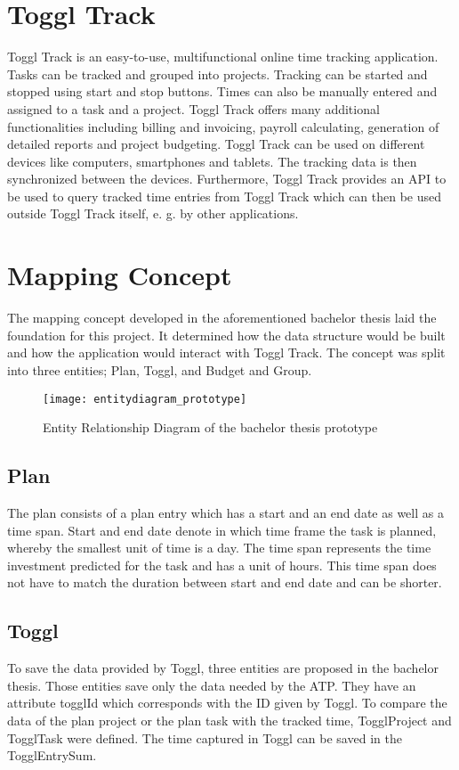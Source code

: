 \section{Toggl Track}
Toggl Track is an easy-to-use, multifunctional online time tracking application. Tasks can be tracked and grouped into projects. Tracking can be started and stopped using start and stop buttons. Times can also be manually entered and assigned to a task and a project. Toggl Track offers many additional functionalities including billing and invoicing, payroll calculating, generation of detailed reports and project budgeting. Toggl Track can be used on different devices like computers, smartphones and tablets. The tracking data is then synchronized between the devices. Furthermore, Toggl Track provides an API to be used to query tracked time entries from Toggl Track which can then be used outside Toggl Track itself, e. g. by other applications. \cite{bachelorarbeit_Egger_Verstappen_page8} \cite{toggl_track_url}

\section{Mapping Concept} \label{Mapping concept}
The mapping concept developed in the aforementioned bachelor thesis \cite{bachelorarbeit_Egger_Verstappen_page20-22} laid the foundation for this project. It determined how the data structure would be built and how the application would interact with Toggl Track. The concept was split into three entities; Plan, Toggl, and Budget and Group. 

\begin{figure}[H]
	\centering
	\texttt{[image: entitydiagram\_prototype]}
	\caption{Entity Relationship Diagram of the bachelor thesis prototype}
	\label{figure2}
\end{figure}

\subsection{Plan}
The plan consists of a plan entry which has a start and an end date as well as a time span. Start and end date denote in which time frame the task is planned, whereby the smallest unit of time is a day. The time span represents the time investment predicted for the task and has a unit of hours. This time span does not have to match the duration between start and end date and can be shorter.
\subsection{Toggl}
To save the data provided by Toggl, three entities are proposed in the bachelor thesis. Those entities save only the data needed by the ATP. They have an attribute togglId which corresponds with the ID given by Toggl. To compare the data of the plan project or the plan task with the tracked time, TogglProject and TogglTask were defined. The time captured in Toggl can be saved in the TogglEntrySum.

